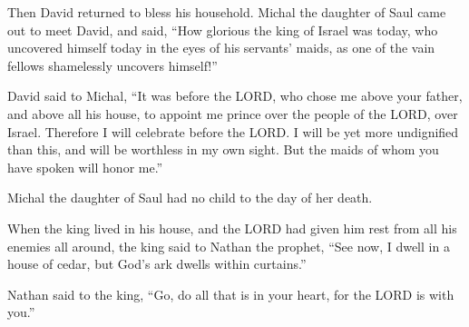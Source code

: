 \myverse{}Then David returned to bless his household. Michal the daughter
of Saul came out to meet David, and said, “How glorious the king of Israel was today, who uncovered himself
today in the eyes of his servants’ maids, as one of the vain fellows shamelessly uncovers himself!”

\myverse{}David said to Michal, “It was before the LORD, who chose me above
your father, and above all his house, to appoint me prince over the people of the LORD, over Israel. Therefore
I will celebrate before the LORD.
\myverse{}I will be yet more undignified than this, and will be worthless in my own
sight. But the maids of whom you have spoken will honor me.”

\myverse{}Michal the daughter of Saul had no child to the day of her death.


\mychapter{} \myverse*{}When the king lived in his house, and the LORD had given him rest
from all his enemies all around,
\myverse{}the king said to Nathan the prophet, “See now, I dwell in a house of cedar,
but God’s ark dwells within curtains.”

\myverse{}Nathan said to the king, “Go, do all that is in your heart, for
the LORD is with you.”

